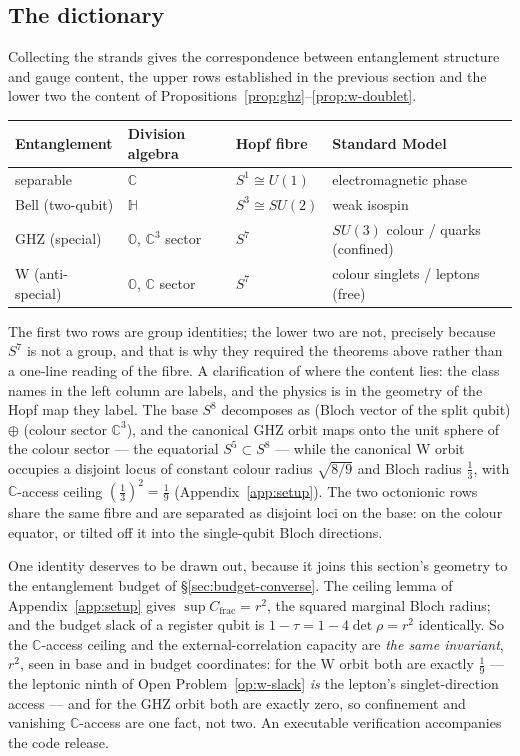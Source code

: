 \subsection{The dictionary}

Collecting the strands gives the correspondence between entanglement structure and gauge content,
the upper rows established in the previous section and the lower two the content of
Propositions~\ref{prop:ghz}--\ref{prop:w-doublet}.

\begin{center}
\begin{tabular}{llll}
\hline
Entanglement & Division algebra & Hopf fibre & Standard Model \\
\hline
separable & $\mathbb{C}$ & $S^1 \cong U(1)$ & electromagnetic phase \\
Bell (two-qubit) & $\mathbb{H}$ & $S^3 \cong SU(2)$ & weak isospin \\
GHZ (special) & $\mathbb{O}$, $\mathbb{C}^3$ sector & $S^7$ & $SU(3)$ colour / quarks (confined) \\
W (anti-special) & $\mathbb{O}$, $\mathbb{C}$ sector & $S^7$ & colour singlets / leptons (free) \\
\hline
\end{tabular}
\end{center}

The first two rows are group identities; the lower two are not, precisely because $S^7$ is not a
group, and that is why they required the theorems above rather than a one-line reading of the fibre.
A clarification of where the content lies: the class names in the left column are labels, and the
physics is in the geometry of the Hopf map they label. The base $S^8$ decomposes as (Bloch vector of
the split qubit) $\oplus$ (colour sector $\mathbb{C}^3$), and the canonical GHZ orbit maps onto the
unit sphere of the colour sector --- the equatorial $S^5\subset S^8$ --- while the canonical W orbit
occupies a disjoint locus of constant colour radius $\sqrt{8/9}$ and Bloch radius $\tfrac13$, with
$\mathbb{C}$-access ceiling $(\tfrac13)^2 = \tfrac19$ (Appendix~\ref{app:setup}). The two octonionic
rows share the same fibre and are separated as disjoint loci on the base: on the colour equator, or
tilted off it into the single-qubit Bloch directions.

One identity deserves to be drawn out, because it joins this section's geometry to the entanglement
budget of \S\ref{sec:budget-converse}. The ceiling lemma of Appendix~\ref{app:setup} gives
$\sup C_{\mathrm{frac}} = r^{2}$, the squared marginal Bloch radius; and the budget slack of a
register qubit is $1 - \tau = 1 - 4\det\rho = r^{2}$ identically. So the $\mathbb{C}$-access
ceiling and the external-correlation capacity are \emph{the same invariant}, $r^{2}$, seen in base
and in budget coordinates: for the W orbit both are exactly $\tfrac19$ --- the leptonic ninth of
Open Problem~\ref{op:w-slack} \emph{is} the lepton's singlet-direction access --- and for the GHZ
orbit both are exactly zero, so confinement and vanishing $\mathbb{C}$-access are one fact, not
two. An executable verification accompanies the code release.

